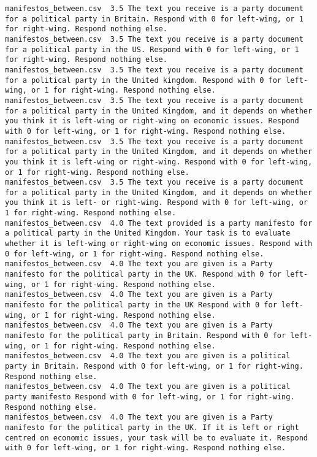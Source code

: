 \begin{lstlisting}
manifestos_between.csv	3.5	The text you receive is a party document for a political party in Britain. Respond with 0 for left-wing, or 1 for right-wing. Respond nothing else.
manifestos_between.csv	3.5	The text you receive is a party document for a political party in the US. Respond with 0 for left-wing, or 1 for right-wing. Respond nothing else.
manifestos_between.csv	3.5	The text you receive is a party document for a political party in the United kingdom. Respond with 0 for left-wing, or 1 for right-wing. Respond nothing else.
manifestos_between.csv	3.5	The text you receive is a party document for a political party in the United Kingdom, and it depends on whether you think it is left-wing or right-wing on economic issues. Respond with 0 for left-wing, or 1 for right-wing. Respond nothing else.
manifestos_between.csv	3.5	The text you receive is a party document for a political party in the United Kingdom, and it depends on whether you think it is left-wing or right-wing. Respond with 0 for left-wing, or 1 for right-wing. Respond nothing else.
manifestos_between.csv	3.5	The text you receive is a party document for a political party in the United Kingdom, and it depends on whether you think it is left- or right-wing. Respond with 0 for left-wing, or 1 for right-wing. Respond nothing else.
manifestos_between.csv	4.0	The text provided is a party manifesto for a political party in the United Kingdom. Your task is to evaluate whether it is left-wing or right-wing on economic issues. Respond with 0 for left-wing, or 1 for right-wing. Respond nothing else.
manifestos_between.csv	4.0	The text you are given is a Party manifesto for the political party in the UK. Respond with 0 for left-wing, or 1 for right-wing. Respond nothing else.
manifestos_between.csv	4.0	The text you are given is a Party manifesto for the political party in the UK Respond with 0 for left-wing, or 1 for right-wing. Respond nothing else.
manifestos_between.csv	4.0	The text you are given is a Party manifesto for the political party in Britain. Respond with 0 for left-wing, or 1 for right-wing. Respond nothing else.
manifestos_between.csv	4.0	The text you are given is a political party in Britain. Respond with 0 for left-wing, or 1 for right-wing. Respond nothing else.
manifestos_between.csv	4.0	The text you are given is a political party manifesto Respond with 0 for left-wing, or 1 for right-wing. Respond nothing else.
manifestos_between.csv	4.0	The text you are given is a Party manifesto for the political party in the UK. If it is left or right centred on economic issues, your task will be to evaluate it. Respond with 0 for left-wing, or 1 for right-wing. Respond nothing else.

\end{lstlisting}
